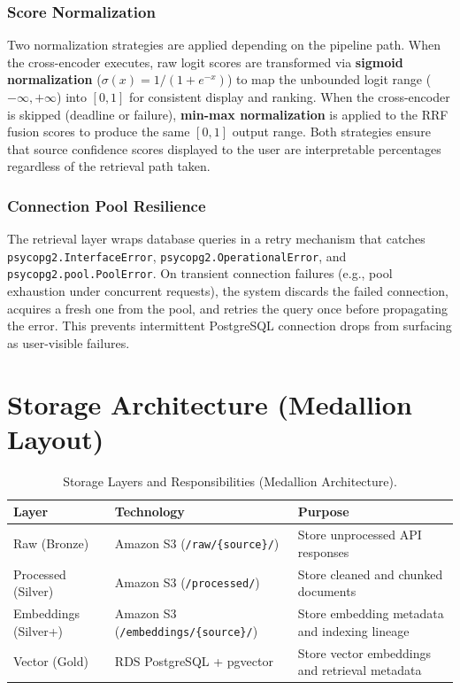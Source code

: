 \subsubsection{Score Normalization}

Two normalization strategies are applied depending on the pipeline path. When the cross-encoder executes, raw logit scores are transformed via \textbf{sigmoid normalization} ($\sigma(x) = 1/(1 + e^{-x})$) to map the unbounded logit range ($-\infty, +\infty$) into $[0, 1]$ for consistent display and ranking. When the cross-encoder is skipped (deadline or failure), \textbf{min-max normalization} is applied to the RRF fusion scores to produce the same $[0, 1]$ output range. Both strategies ensure that source confidence scores displayed to the user are interpretable percentages regardless of the retrieval path taken.

\subsubsection{Connection Pool Resilience}

The retrieval layer wraps database queries in a retry mechanism that catches \texttt{psycopg2.InterfaceError}, \texttt{psycopg2.OperationalError}, and \texttt{psycopg2.pool.PoolError}. On transient connection failures (e.g., pool exhaustion under concurrent requests), the system discards the failed connection, acquires a fresh one from the pool, and retries the query once before propagating the error. This prevents intermittent PostgreSQL connection drops from surfacing as user-visible failures.

\section{Storage Architecture (Medallion Layout)}
\label{sec:storage}

\begin{table}[H]
\caption{Storage Layers and Responsibilities (Medallion Architecture).}
\label{tab:storage_layers}
\centering
\begin{tabular}{p{2.8cm}p{5.8cm}p{4.0cm}}
\toprule
\textbf{Layer} & \textbf{Technology} & \textbf{Purpose} \\
\midrule
Raw (Bronze) & Amazon S3 (\texttt{/raw/\{source\}/}) & Store unprocessed API responses \\
Processed (Silver) & Amazon S3 (\texttt{/processed/}) & Store cleaned and chunked documents \\
Embeddings (Silver+) & Amazon S3 (\texttt{/embeddings/\{source\}/}) & Store embedding metadata and indexing lineage \\
Vector (Gold) & RDS PostgreSQL + pgvector & Store vector embeddings and retrieval metadata \\
\bottomrule
\end{tabular}
\end{table}

